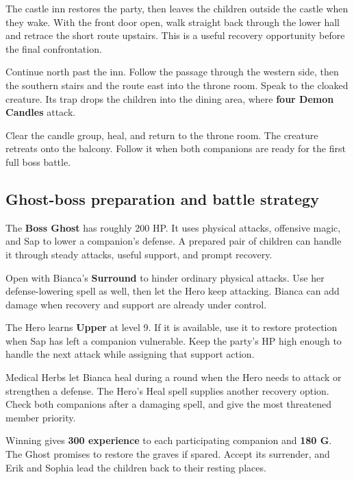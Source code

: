 The castle inn restores the party, then leaves the children outside
the castle when they wake. With the front door open, walk straight back
through the lower hall and retrace the short route upstairs. This is a
useful recovery opportunity before the final confrontation.

Continue north past the inn. Follow the passage through the western side,
then the southern stairs and the route east into the throne room. Speak
to the cloaked creature. Its trap drops the children into the dining
area, where \textbf{four Demon Candles} attack.

Clear the candle group, heal, and return to the throne room. The creature
retreats onto the balcony. Follow it when both companions are ready for
the first full boss battle.

\subsection{Ghost-boss preparation and battle strategy}

The \textbf{Boss Ghost} has roughly 200 HP. It uses physical attacks,
offensive magic, and Sap to lower a companion's defense. A prepared pair
of children can handle it through steady attacks, useful support, and
prompt recovery.

Open with Bianca's \textbf{Surround} to hinder ordinary physical attacks.
Use her defense-lowering spell as well, then let the Hero keep attacking.
Bianca can add damage when recovery and support are already under control.

The Hero learns \textbf{Upper} at level 9. If it is available, use it to
restore protection when Sap has left a companion vulnerable. Keep the
party's HP high enough to handle the next attack while assigning that
support action.

Medical Herbs let Bianca heal during a round when the Hero needs to
attack or strengthen a defense. The Hero's Heal spell supplies another
recovery option. Check both companions after a damaging spell, and give
the most threatened member priority.

Winning gives \textbf{300 experience} to each participating companion
and \textbf{180 G}. The Ghost promises to restore the graves if spared.
Accept its surrender, and Erik and Sophia lead the children back to
their resting places.


